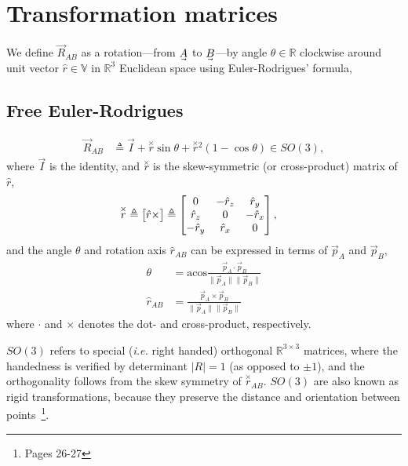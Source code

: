 \section{Transformation matrices}\label{IV_transformation_matrices} 

We define $\vec{R}_{AB}$ as a rotation---from $\uvec{A}$ to $\uvec{B}$---by angle $\theta\in\mathbb{R}$ clockwise around unit vector $\hat{r}\in\mathbb{V}$ in $\mathbb{R}^3$ Euclidean space using Euler-Rodrigues' formula,

\subsection{Free Euler-Rodrigues}\label{IV_sec:free_euler_rodrigues}
%
\begin{align}\label{eq:M}
\vec{R}_{AB}
&\triangleq %
 \vec{I} + \overset{\times}{r}\sin\theta + \overset{\times}{r}{}^2(1-\cos\theta) \in SO(3),
\end{align}
%
where $\vec{I}$ is the identity, and $\overset{\times}{r}$ is the skew-symmetric (or cross-product) matrix of $\hat{r}$,
%
\begin{align}
\overset{\times}{r}
&\triangleq \bmat{\hat{r}\times} \triangleq \bmat{
0 & -\hat{r}_z & \hat{r}_y \\
\hat{r}_z & 0 & -\hat{r}_x \\
-\hat{r}_y & \hat{r}_x & 0
},
\end{align}
%
and the angle $\theta$ and rotation axis $\hat{r}_{AB}$ can be expressed in terms of $\vec{p}_A$ and $\vec{p}_{B}$,
%
\begin{align}
\theta
&= \mathrm{acos}\frac{\vec{p}_{A}\cdot\vec{p}_{B}}{\lVert\vec{p}_{A}\rVert\lVert\vec{p}_{B}\rVert} \\
\hat{r}_{AB} &=  \frac{\vec{p}_{A}\times\vec{p}_{B}}{\lVert\vec{p}_{A}\rVert\lVert\vec{p}_{B}\rVert}
\end{align}
%
where $\cdot$ and $\times$ denotes the dot- and cross-product, respectively.

$SO(3)$ refers to special (\emph{i.e.} right handed) orthogonal $\mathbb{R}^{3\times3}$ matrices, where the handedness is verified by determinant $\big|R\big|=1$ (as opposed to $\pm1$), and the orthogonality follows from the skew symmetry of $\overset{\times}{r}_{AB}$. $SO(3)$ are also known as rigid transformations, because they preserve the distance and orientation between points~\cite{Murray1994}\footnote{Pages 26-27}.

